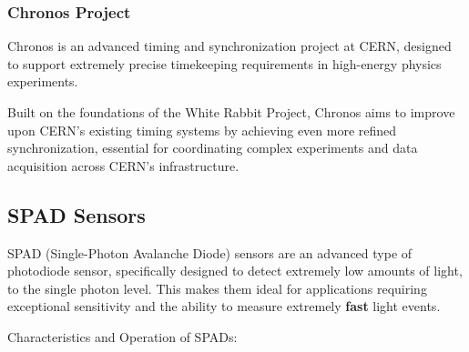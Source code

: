 \subsubsection{Chronos Project}

Chronos is an advanced timing and synchronization project at CERN, designed to support extremely precise timekeeping requirements in high-energy physics experiments. 

\vspace{5 mm}

\noindent Built on the foundations of the White Rabbit Project, Chronos \cite{gl:chronos} aims to improve upon CERN’s existing timing systems by achieving even more refined synchronization, essential for coordinating complex experiments and data acquisition across CERN’s infrastructure.

\subsection{SPAD Sensors}

SPAD (Single-Photon Avalanche Diode) \cite{9031298} sensors are an advanced type of photodiode sensor, specifically designed to detect extremely low amounts of light, to the single photon level. 
This makes them ideal for applications requiring exceptional sensitivity and the ability to measure extremely \textbf{fast} light events.

\vspace{5 mm}

\noindent Characteristics and Operation of SPADs:

